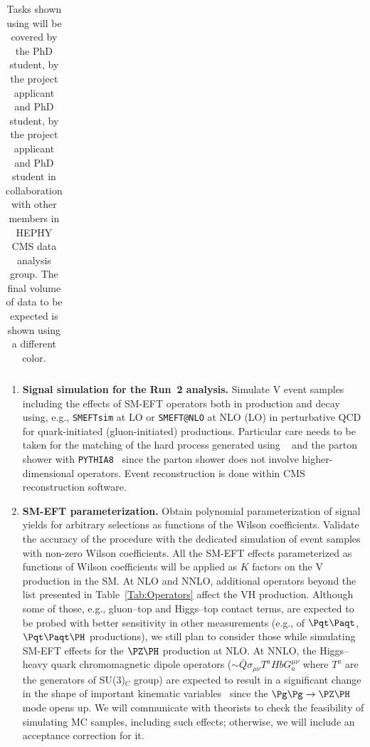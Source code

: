\documentclass[a4paper,11pt]{article}
\newcommand{\Pt}{{{\Pqt}}\xspace}
\newcommand{\PAt}{{{{\Paqt}}}\xspace}
\def\strut{\relax\ifmmode\copy\strutbox\else\unhcopy\strutbox\fi}
\renewcommand{\PV}{{{{V}}}\xspace}
\newcommand{\VH}{{{\PV}{\PH}}\xspace}
\begin{document}
\begin{table}
\begin{tabular}{l|m{0.9cm}|m{1.5cm}|m{0.9cm}|m{0.9cm}|m{0.9cm}|m{0.9cm}|m{0.9cm}|m{0.9cm}|m{0.9cm}|m{0.9cm}|m{0.9cm}|m{0.9cm}|m{0.9cm}|m{0.9cm}|m{0.9cm}|}
    \hline
  \end{tabular}
  \caption{
Tasks shown using \colorbox{gray}{ \makebox[0.01\textwidth][20cm]{\strut}} will be covered by the PhD student, \colorbox{green}{ \makebox[0.01\textwidth][20cm]{\strut}} by the project applicant and PhD student, \colorbox{orange}{ \makebox[0.01\textwidth][20cm]{\strut}} by the project applicant and PhD student in collaboration with other members in HEPHY CMS data analysis group. 
The final volume of data to be expected is shown using a different color. 
}
\label{tab:workplan}
\end{table}

\begin{enumerate}[noitemsep,topsep=0pt]
\item {\bf Signal simulation for the Run~2 analysis.} Simulate \VH event samples including the effects of SM-EFT operators both in production and decay using, e.g., \texttt{SMEFTsim} at LO or \texttt{SMEFT@NLO} at NLO (LO) in perturbative QCD for quark-initiated (gluon-initiated) productions. 
Particular care needs to be taken for the matching of the hard process generated using \texttt{\MGvATNLO}~\cite{Alwall:2014hca} and the parton shower with \texttt{PYTHIA8}~\cite{Sjostrand:2014zea} 
since the parton shower does not involve higher-dimensional operators. Event reconstruction is done within CMS reconstruction software.

\item {\bf SM-EFT parameterization.} Obtain polynomial parameterization of signal yields for arbitrary selections as functions of the Wilson coefficients. Validate the accuracy of the procedure with the dedicated simulation of event samples with non-zero Wilson coefficients.
All the SM-EFT effects parameterized as functions of Wilson coefficients will be applied as $K$ factors on the \VH production in the SM. 
At NLO and NNLO, additional operators beyond the list presented in Table~\ref{Tab:Operators} affect the VH production. Although some of those, e.g., gluon--top and Higgs--top contact terms, are expected to be probed with better sensitivity in other measurements (e.g., of $\Pt\PAt$, $\Pt\PAt\PH$ productions), we still plan to consider those while simulating SM-EFT effects for the $\PZ\PH$ production at NLO. 
At NNLO, the Higgs--heavy quark chromomagnetic dipole operators ($\sim \bar{Q} {\sigma}_{\mu\nu} T^a H b G^{\mu\nu}_{a}$ where $T^a$ are the generators of SU(3)$_C$ group) are expected to result in a significant change in the shape of important kinematic variables~\cite{BessidskaiaBylund:2016jvp,Haisch:2022nwz} since the $\Pg\Pg \rightarrow \PZ\PH$ mode opens up. 
We will communicate with theorists to check the feasibility of simulating MC samples, including such effects; otherwise, we will include an acceptance correction for it.


\end{enumerate}
\end{document}
